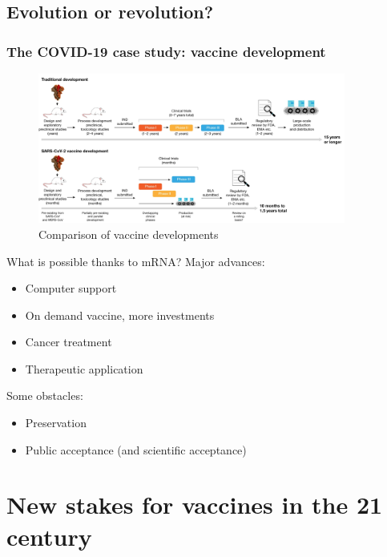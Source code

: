 \subsection{Evolution or revolution?}


\begin{frame}
    \frametitle{The COVID-19 case study: vaccine development}
    \begin{figure}
        \centering
        \includegraphics[width=0.9\textwidth]{imgs/CovidDev.png}
        \caption{Comparison of vaccine developments \autocite{krammerSARSCoV2VaccinesDevelopment2020}}
        \label{fig:responses5}
    \end{figure}
\end{frame}

\begin{frame}{What is possible thanks to mRNA?}
    Major advances:
    \begin{itemize}
        \item Computer support
        \item On demand vaccine, more investments
        \item Cancer treatment %
        \item Therapeutic application
    \end{itemize}
    Some obstacles:
    \begin{itemize}
        \item Preservation
        \item Public acceptance (and scientific acceptance)
    \end{itemize}
\end{frame}

\section{New stakes for vaccines in the 21 century}

